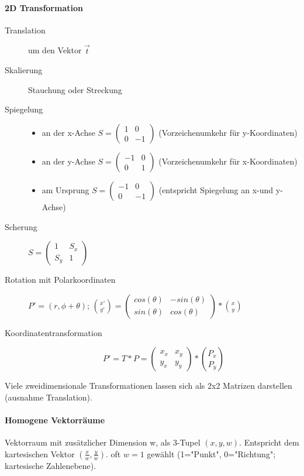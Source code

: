 \documentclass[10pt,landscape]{article}
\begin{document}
\begin{multicols}{3}
\paragraph*{2D Transformation}
\begin{description}
    \item[Translation] um den Vektor $\vec{t}$
    \item[Skalierung] Stauchung oder Streckung
    \item[Spiegelung]
    \begin{itemize}
        \item an der x-Achse $S=\begin{pmatrix} 1 & 0 \\ 0 & -1 \end{pmatrix}$ (Vorzeichenumkehr für y-Koordinaten)
        \item an der y-Achse $S=\begin{pmatrix} -1 & 0 \\ 0 & 1 \end{pmatrix}$ (Vorzeichenumkehr für x-Koordinaten)
        \item am Ursprung $S=\begin{pmatrix} -1 & 0 \\ 0 & -1 \end{pmatrix}$ (entspricht Spiegelung an x-und y-Achse)
    \end{itemize}
    \item[Scherung] $S=\begin{pmatrix} 1 & S_x \\ S_y & 1 \end{pmatrix}$
    \item[Rotation mit Polarkoordinaten] $P'=(r,\phi+\theta)$; $\binom{x'}{y'}=\begin{pmatrix} cos(\theta) & -sin(\theta) \\ sin(\theta) & cos(\theta)\end{pmatrix}*\binom{x}{y}$
    \item[Koordinatentransformation] $$P' =T*P = \begin{pmatrix} x_x & x_y\\ y_x & y_y \end{pmatrix} * \binom{P_x}{P_y}$$ 
\end{description}
Viele zweidimensionale Transformationen lassen sich als 2x2 Matrizen darstellen (ausnahme Translation). 

\paragraph*{Homogene Vektorräume}
Vektorraum mit zusätzlicher Dimension w, als 3-Tupel $(x,y,w)$. 
Entspricht dem kartesischen Vektor $(\frac{x}{w},\frac{y}{w})$.
oft $w=1$ gewählt (1="Punkt", 0="Richtung"; kartesische Zahlenebene).


\end{multicols}
\end{document}
